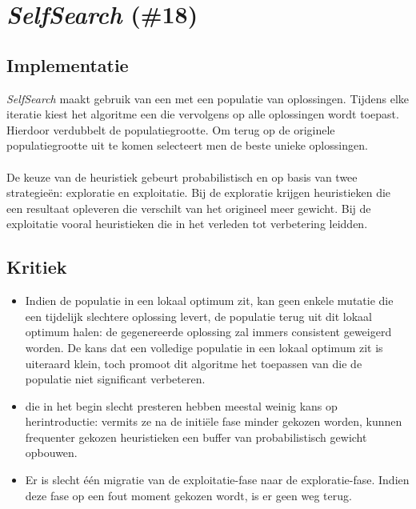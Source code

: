 \section{\emph{SelfSearch} (\#18)}

\subsection{Implementatie}
\emph{SelfSearch}\cite{chesc-selfsearch} maakt gebruik van een met een populatie van oplossingen. Tijdens elke iteratie kiest het algoritme een \abllh{} die vervolgens op alle oplossingen wordt toepast. Hierdoor verdubbelt de populatiegrootte. Om terug op de originele populatiegrootte uit te komen selecteert men de beste unieke oplossingen.
\paragraph{}
De keuze van de heuristiek gebeurt probabilistisch en op basis van twee strategie\"en: exploratie en exploitatie. Bij de exploratie krijgen heuristieken die een resultaat opleveren die verschilt van het origineel meer gewicht. Bij de exploitatie vooral heuristieken die in het verleden tot verbetering leidden.
\subsection{Kritiek}
\begin{itemize}
\item Indien de populatie in een lokaal optimum zit, kan geen enkele mutatie die een tijdelijk slechtere oplossing levert, de populatie terug uit dit lokaal optimum halen: de gegenereerde oplossing zal immers consistent geweigerd worden. De kans dat een volledige populatie in een lokaal optimum zit is uiteraard klein, toch promoot dit algoritme het toepassen van \abhn{} die de populatie niet significant verbeteren.
 \item \abhn{} die in het begin slecht presteren hebben meestal weinig kans op herintroductie: vermits ze na de initi\"ele fase minder gekozen worden, kunnen frequenter gekozen heuristieken een buffer van probabilistisch gewicht opbouwen.
 \item Er is slecht \'e\'en migratie van de exploitatie-fase naar de exploratie-fase. Indien deze fase op een fout moment gekozen wordt, is er geen weg terug.
\end{itemize}